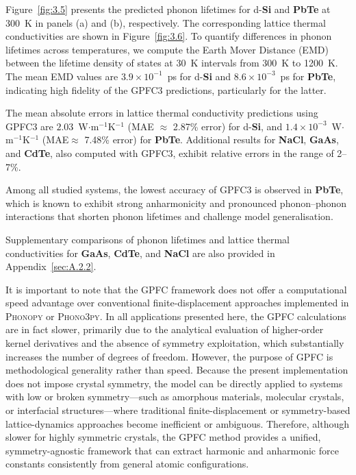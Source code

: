 Figure~\ref{fig:3.5} presents the predicted phonon lifetimes for d-\textbf{Si} and \textbf{PbTe} at 300~K in panels (a) and (b), respectively. The corresponding lattice thermal conductivities are shown in Figure~\ref{fig:3.6}.
To quantify differences in phonon lifetimes across temperatures, we compute the Earth Mover Distance (EMD) between the lifetime density of states at 30~K intervals from 300~K to 1200~K.
The mean EMD values are $3.9 \times 10^{-1}$~ps for d-\textbf{Si} and $8.6 \times 10^{-3}$~ps for \textbf{PbTe}, indicating high fidelity of the GPFC3 predictions, particularly for the latter.

The mean absolute errors in lattice thermal conductivity predictions using GPFC3 are $2.03$~W$\cdot$m$^{-1}$K$^{-1}$ (MAE $\approx$ 2.87\% error) for d-\textbf{Si}, and $1.4 \times 10^{-3}$~W$\cdot$m$^{-1}$K$^{-1}$ (MAE$\approx$ 7.48\% error) for \textbf{PbTe}. Additional results for \textbf{NaCl}, \textbf{GaAs}, and \textbf{CdTe}, also computed with GPFC3, exhibit relative errors in the range of 2–7\%.

Among all studied systems, the lowest accuracy of GPFC3 is observed in \textbf{PbTe}, which is known to exhibit strong anharmonicity and pronounced phonon–phonon interactions that shorten phonon lifetimes and challenge model generalisation.

Supplementary comparisons of phonon lifetimes and lattice thermal conductivities for \textbf{GaAs}, \textbf{CdTe}, and \textbf{NaCl} are also provided in Appendix~\ref{sec:A.2.2}.

It is important to note that the GPFC framework does not offer a computational speed advantage over conventional finite-displacement approaches implemented in \textsc{Phonopy} or \textsc{Phono3py}. 
In all applications presented here, the GPFC calculations are in fact slower, primarily due to the analytical evaluation of higher-order kernel derivatives and the absence of symmetry exploitation, which substantially increases the number of degrees of freedom. 
However, the purpose of GPFC is methodological generality rather than speed. 
Because the present implementation does not impose crystal symmetry, the model can be directly applied to systems with low or broken symmetry—such as amorphous materials, molecular crystals, or interfacial structures—where traditional finite-displacement or symmetry-based lattice-dynamics approaches become inefficient or ambiguous. 
Therefore, although slower for highly symmetric crystals, the GPFC method provides a unified, symmetry-agnostic framework that can extract harmonic and anharmonic force constants consistently from general atomic configurations.

